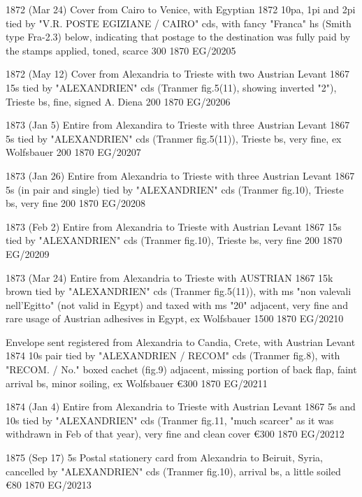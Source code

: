 \documentclass[justified]{tufte-book}
\begin{document}
%
{1872 (Mar 24) Cover from Cairo to Venice, with Egyptian 1872 10pa, 1pi and 2pi tied by "V.R. POSTE EGIZIANE / CAIRO" cds, with fancy "Franca" hs (Smith type Fra-2.3) below, indicating that postage to the destination was fully paid by the stamps applied, toned, scarce 300}
{1870}%
{EG/20205}%
{}%
{}
{}%
{}

%
{1872 (May 12) Cover from Alexandria to Trieste with two Austrian Levant 1867 15s tied by "ALEXANDRIEN" cds (Tranmer fig.5(11), showing inverted "2"), Trieste bs, fine, signed A. Diena 200}
{1870}%
{EG/20206}%
{}%
{}
{}%
{}

%
{1873 (Jan 5) Entire from Alexandira to Trieste with three Austrian Levant 1867 5s tied by "ALEXANDRIEN" cds (Tranmer fig.5(11)), Trieste bs, very fine, ex Wolfsbauer 200}
{1870}%
{EG/20207}%
{}%
{}
{}%
{}

%
{1873 (Jan 26) Entire from Alexandria to Trieste with three Austrian Levant 1867 5s (in pair and single) tied by "ALEXANDRIEN" cds (Tranmer fig.10), Trieste bs, very fine 200}
{1870}%
{EG/20208}%
{}%
{}
{}%
{}

%
{1873 (Feb 2) Entire from Alexandria to Trieste with Austrian Levant 1867 15s tied by "ALEXANDRIEN" cds (Tranmer fig.10), Trieste bs, very fine 200}
{1870}%
{EG/20209}%
{}%
{}
{}%
{}

%
{1873 (Mar 24) Entire from Alexandria to Trieste with AUSTRIAN 1867 15k brown tied by "ALEXANDRIEN" cds (Tranmer fig.5(11)), with ms "non valevali nell'Egitto" (not valid in Egypt) and taxed with ms "20" adjacent, very fine and rare usage of Austrian adhesives in Egypt, ex Wolfsbauer 1500}
{1870}%
{EG/20210}%
{}%
{}
{}%
{}

%
{Envelope sent registered from Alexandria to Candia, Crete, with Austrian Levant 1874 10s pair tied by "ALEXANDRIEN / RECOM" cds (Tranmer fig.8), with "RECOM. / No." boxed cachet (fig.9) adjacent, missing portion of back flap, faint arrival bs, minor soiling, ex Wolfsbauer \euro 300
}
{1870}%
{EG/20211}%
{}%
{}
{}%
{}


%
{1874 (Jan 4) Entire from Alexandria to Trieste with Austrian Levant 1867 5s and 10s tied by "ALEXANDRIEN" cds (Tranmer fig.11, "much scarcer" as it was withdrawn in Feb of that year), very fine and clean cover \euro 300
}
{1870}%
{EG/20212}%
{}%
{}
{}%
{}


%
{1875 (Sep 17) 5s Postal stationery card from Alexandria to Beiruit, Syria, cancelled by "ALEXANDRIEN" cds (Tranmer fig.10), arrival bs, a little soiled \euro 80
}
{1870}%
{EG/20213}%
{}%
{}
{}%
{}
\end{document}
